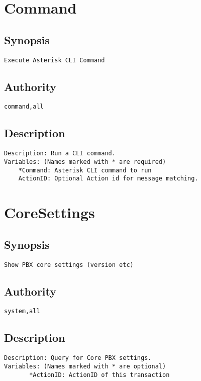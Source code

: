 \section{Command}
\subsection{Synopsis}
\begin{verbatim}
Execute Asterisk CLI Command
\end{verbatim}
\subsection{Authority}
\begin{verbatim}
command,all
\end{verbatim}
\subsection{Description}
\begin{verbatim}
Description: Run a CLI command.
Variables: (Names marked with * are required)
	*Command: Asterisk CLI command to run
	ActionID: Optional Action id for message matching.

\end{verbatim}


\section{CoreSettings}
\subsection{Synopsis}
\begin{verbatim}
Show PBX core settings (version etc)
\end{verbatim}
\subsection{Authority}
\begin{verbatim}
system,all
\end{verbatim}
\subsection{Description}
\begin{verbatim}
Description: Query for Core PBX settings.
Variables: (Names marked with * are optional)
       *ActionID: ActionID of this transaction

\end{verbatim}


